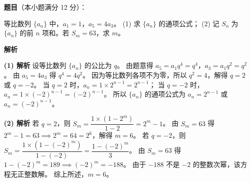 \begin{answer}

\textbf{题目}（本小题满分 12 分）：

等比数列 $\{a_n\}$ 中，$a_1 = 1$，$a_5 = 4a_3$。
(1) 求 $\{a_n\}$ 的通项公式；
(2) 记 $S_n$ 为 $\{a_n\}$ 的前 $n$ 项和。若 $S_m = 63$，求 $m$。

\textbf{解析}

\textbf{(1) 解析} 设等比数列 $\{a_n\}$ 的公比为 $q$。
由题意得 $a_5 = a_1 q^4 = q^4$，$a_3 = a_1 q^2 = q^2$。
由 $a_5 = 4a_3$ 得 $q^4 = 4q^2$。
因为等比数列各项不为零，所以 $q^2 = 4$，解得 $q = 2$ 或 $q = -2$。
当 $q = 2$ 时，$a_n = 1\times 2^{n-1} = 2^{n-1}$；
当 $q = -2$ 时，$a_n = 1\times (-2)^{n-1} = (-2)^{n-1}$。
所以 $\{a_n\}$ 的通项公式为 $a_n = 2^{n-1}$ 或 $a_n = (-2)^{n-1}$。

\textbf{(2) 解析}
若 $q = 2$，则 $S_m = \dfrac{1\times(1 - 2^m)}{1 - 2} = 2^m - 1$。
由 $S_m = 63$ 得 $2^m - 1 = 63 \implies 2^m = 64 = 2^6$，解得 $m = 6$。
若 $q = -2$，则 $S_m = \dfrac{1\times(1 - (-2)^m)}{1 - (-2)} = \dfrac{1 - (-2)^m}{3}$。
由 $S_m = 63$ 得 $1 - (-2)^m = 189 \implies (-2)^m = -188$。
由于 $-188$ 不是 $-2$ 的整数次幂，该方程无正整数解。
综上所述，$m = 6$。



\end{answer}
